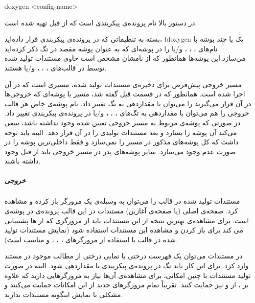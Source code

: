 \begin{Shell}
doxygen <config-name>
\end{Shell}

در دستور بالا  نام پرونده‌ی پیکربندی است که از قبل تهیه شده است.


بسته به تنظیماتی که در پرونده‌ی پیکربندی قرار داده‌اید، \l{doxygen} یک یا چند
پوشه با نام‌های ، ، ،  و/یا  را در
پوشه‌ای که به عنوان پوشه مقصد در تگ  ذکر کرده‌اید
می‌سازد.این پوشه‌ها همانطور که از نامشان مشخص است حاوی مستندات تولید شده توسط
 در قالب‌های ، ، ،  و/یا
 هستند.

مسیر خروجی پیش‌فرض برای ذخیره‌ی مستندات تولید شده، مسیری است که  در
آن اجرا شده است.
همانطور که در قسمت قبل گفته شد، مسیر یا پوشه‌ای که خروجی‌ها در آن قرار می‌گیرند
را می‌توان با مقداردهی به تگ  تغییر داد. نام پوشه‌ی خاص هر
قالب خروجی را هم می‌توان با مقداردهی به تگ‌های ،
، ،  و/یا  در
پرونده‌ی پیکربندی تغییر داد. در صورتی که پوشه‌ی مربوط به مسیر خروجی تعیین شده
وجود نداشته باشد،  سعی می‌کند آن پوشه را بسازد و بعد مستندات تولیدی
را در آن قرار دهد. البته باید توجه داشت که  کل پوشه‌های مذکور در
مسیر را نمی‌سازد و فقط داخلی‌ترین پوشه را در صورت عدم وجود می‌سازد. سایر
پوشه‌های پدر در مسیر خروجی باید از قبل وجود داشته باشند.

\subparagraph{خروجی }

مستندات تولید شده در قالب  را می‌توان به وسیله‌ی یک مرورگر 
باز کرده و مشاهده کرد. صفحه‌ی اصلی (یا صفحه‌ی آغازین) مستندات در این قالب
پرونده‌ی  در پوشه‌ی  است. برای مشاهده‌ی بهترین نتیجه از
این مستندات باید از مرورگری که از ها پشتیبانی می کند برای باز کردن و
مشاهده این مستندات استفاده شود (نمایش مستندات تولید شده در قالب  با
استفاده از مرورگرهای ، ، ، و  مناسب
است).

در مستندات  می‌توان یک فهرست درختی یا نمایی درختی از مطالب موجود در
مستند وارد کرد. برای این کار باید تگ  در پرونده‌ی
پیکربندی با  مقداردهی شود. البته در صورت تولید مستندات با چنین امکانی،
برای مشاهده‌ی آن‌ها نیاز به مرورگرهایی دارید که علاوه بر ، از 
و  نیز حمایت کنند.
تقریباً تمام مرورگرهای جدید از این امکانات حمایت می‌کنند و مشکلی با نمایش
اینگونه مستندات ندارند.


